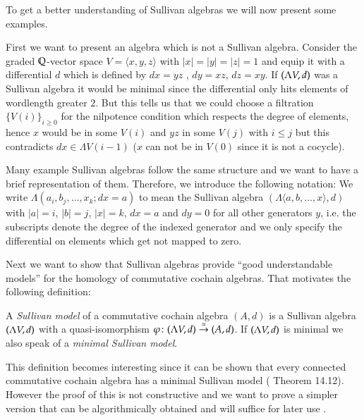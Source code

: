 To get a better understanding of Sullivan algebras we will now present some examples.

\begin{Example}
 First we want to present an algebra which is not a Sullivan algebra. 
 Consider the graded $\mathbb{Q}$-vector space $V = \langle x,y,z \rangle$ with $|x| = |y| = |z| = 1$ and 
 equip it with a differential $d$ which is defined by $dx = yz$ , $dy = xz$, $dz = xy$. \newline
 If $(\Lambda V,d)$ was a Sullivan algebra it would be minimal since 
 the differential only hits elements of wordlength greater $2$. But this tells us that we could choose a filtration 
 ${\lbrace V(i) \rbrace}_{i \geq 0}$ for
 the nilpotence condition which respects the degree of elements, hence $ x $ would be in some $V(i)$ and $yz$ in some $V(j)$
 with $i \leq j$ but this contradicts $dx \in \Lambda V(i-1)$ ($x$ can not be in $V(0)$ since it is not a cocycle).
 \end{Example}

\begin{Remark}
 Many example Sullivan algebras follow the same structure and we want to have a brief representation of them.
 Therefore, we introduce the following notation: \newline
 We write $\Lambda (a_i , b_j, \ldots, x_k ; d x = a)$ to mean the Sullivan algebra
 $(\Lambda \langle a, b, \ldots, x \rangle , d) $ with $|a| = i$, $|b| = j$, $|x| = k$, $d x = a$ and
 $dy = 0 $ for all other generators $y$, i.e. the subscripts denote the degree of the indexed generator and
 we only specify the differential on elements which get not mapped to zero.
\end{Remark}




Next we want to show that Sullivan algebras provide ``good understandable models'' for the homology of commutative cochain algebras. That motivates
the following definition:

\begin{Definition}
  A \emph{Sullivan model} of a commutative cochain algebra $(A,d)$ is a Sullivan algebra $(\Lambda V,d)$ with a quasi-isomorphism
  $\varphi \colon (\Lambda V,d) \overset{\simeq}{\to} (A,d)$. If $(\Lambda V,d)$ is minimal we also speak of a 
  \emph{minimal Sullivan model}.
\end{Definition}

\begin{Remark}
\label{rem:MinimalSullivanModelsExist}
This definition becomes interesting since it can be shown that every connected commutative cochain algebra has a minimal Sullivan model
(\cite{Felix2001} Theorem 14.12). However the proof of this is not constructive and we want to prove a simpler 
version that can be algorithmically obtained and will suffice for later use .
\end{Remark}

